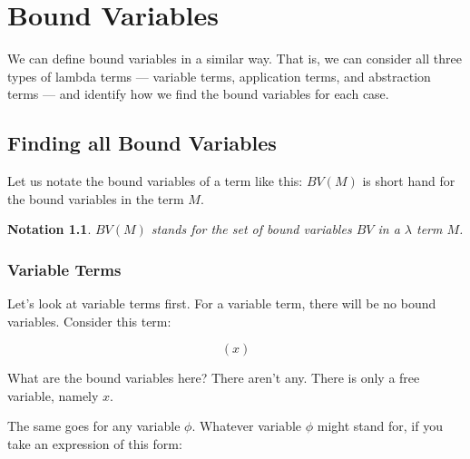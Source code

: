 \documentclass{book}
\numberwithin{equation}{chapter}
\newtheorem{notation}{Notation}
\begin{document}
\chapter{Bound Variables}

We can define bound variables in a similar way. That is, we can consider all three types of lambda terms --- variable terms, application terms, and abstraction terms --- and identify how we find the bound variables for each case. 


\section{Finding all Bound Variables}

Let us notate the bound variables of a term like this: $BV(M)$ is short hand for the bound variables in the term $M$.

\begin{notation}
$BV(M)$ stands for the set of bound variables $BV$ in a $\lambda$ term $M$.
\end{notation}


\subsection{Variable Terms}

Let's look at variable terms first. For a variable term, there will be no bound variables. Consider this term:

\begin{equation}
(x)
\end{equation}

\noindent
What are the bound variables here? There aren't any. There is only a free variable, namely $x$. 

The same goes for any variable $\phi$. Whatever variable $\phi$ might stand for, if you take an expression of this form:
\end{document}
